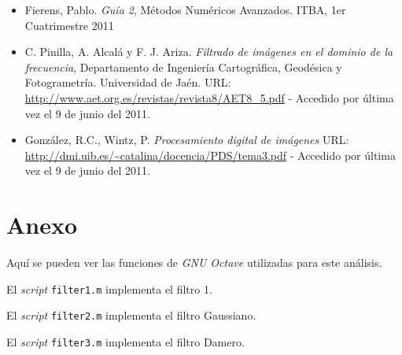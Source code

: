 \documentclass{article}
\begin{document}
\begin{itemize}
  \item Fierens, Pablo. \textit{Guía 2}, Métodos Numéricos Avanzados. ITBA, 1er Cuatrimestre 2011
  \item C. Pinilla, A. Alcalá y F. J. Ariza. \textit{Filtrado de imágenes en el dominio de la frecuencia}, Departamento de Ingeniería Cartográfica, Geodésica y Fotogrametría. Universidad de Jaén. URL: \url{http://www.aet.org.es/revistas/revista8/AET8_5.pdf} - Accedido por última vez el 9 de junio del 2011.
  \item González, R.C., Wintz, P. \textit{Procesamiento digital de imágenes} URL: \url{http://dmi.uib.es/~catalina/docencia/PDS/tema3.pdf} - Accedido por última vez el 9 de junio del 2011.
\end{itemize}

\clearpage

\section{Anexo}
\par Aquí se pueden ver las funciones de \textit{GNU Octave} utilizadas para este análisis.\\

\par El \textit{script} \verb+filter1.m+ implementa el filtro 1.

\begin{ttfamily}
\begin{center}
\end{center}
\end{ttfamily}

\par El \textit{script} \verb+filter2.m+ implementa el filtro Gaussiano.

\begin{ttfamily}
\begin{center}
\end{center}
\end{ttfamily}

\par El \textit{script} \verb+filter3.m+ implementa el filtro Damero.

\begin{ttfamily}
\begin{center}
\end{center}
\end{ttfamily}
\end{document}
